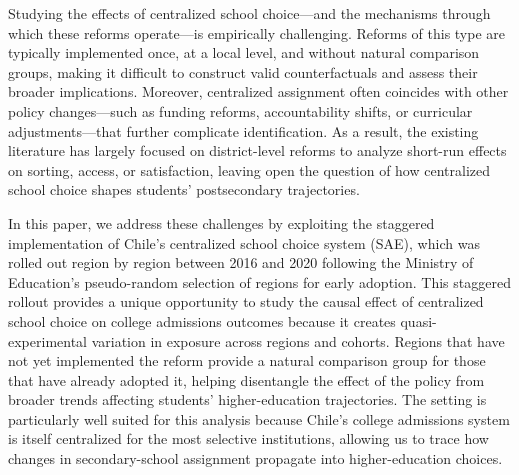 \documentclass[11pt]{article}
\begin{document}

Studying the effects of centralized school choice---and the mechanisms through which these reforms operate---is empirically challenging. Reforms of this type are typically implemented once, at a local level, and without natural comparison groups, making it difficult to construct valid counterfactuals and assess their broader implications. Moreover, centralized assignment often coincides with other policy changes---such as funding reforms, accountability shifts, or curricular adjustments---that further complicate identification.  As a result, the existing literature has largely focused on district-level reforms to analyze short-run effects on sorting, access, or satisfaction, leaving open the question of how centralized school choice shapes students' postsecondary trajectories.

In this paper, we address these challenges by exploiting the staggered implementation of Chile's centralized school choice system (SAE), which was rolled out region by region between 2016 and 2020 following the Ministry of Education’s pseudo-random selection of regions for early adoption. 
This staggered rollout provides a unique opportunity to study the causal effect of centralized school choice on college admissions outcomes because it creates quasi-experimental variation in exposure across regions and cohorts. Regions that have not yet implemented the reform provide a natural comparison group for those that have already adopted it, helping disentangle the effect of the policy from broader trends affecting students' higher-education trajectories.
The setting is particularly well suited for this analysis because Chile's college admissions system is itself centralized for the most selective institutions, allowing us to trace how changes in secondary-school assignment propagate into higher-education choices.
\end{document}
